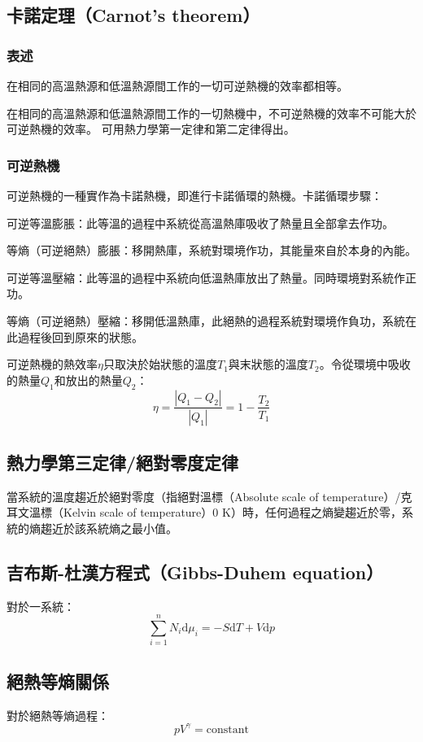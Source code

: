 \documentclass[a4paper,12pt]{report}
\begin{document}
\subsection{卡諾定理（Carnot's theorem）}
\subsubsection{表述}
\bit
\item 在相同的高溫熱源和低溫熱源間工作的一切可逆熱機的效率都相等。
\item 在相同的高溫熱源和低溫熱源間工作的一切熱機中，不可逆熱機的效率不可能大於可逆熱機的效率。
\eit
可用熱力學第一定律和第二定律得出。
\subsubsection{可逆熱機}
可逆熱機的一種實作為卡諾熱機，即進行卡諾循環的熱機。卡諾循環步驟：
\bit
\item 可逆等溫膨脹：此等溫的過程中系統從高溫熱庫吸收了熱量且全部拿去作功。
\item 等熵（可逆絕熱）膨脹：移開熱庫，系統對環境作功，其能量來自於本身的內能。
\item 可逆等溫壓縮：此等溫的過程中系統向低溫熱庫放出了熱量。同時環境對系統作正功。
\item 等熵（可逆絕熱）壓縮：移開低溫熱庫，此絕熱的過程系統對環境作負功，系統在此過程後回到原來的狀態。
\item 可逆熱機的熱效率$\eta$只取決於始狀態的溫度$T_1$與末狀態的溫度$T_2$。令從環境中吸收的熱量$Q_1$和放出的熱量$Q_2$：
\[\eta = \frac{\left|Q_1-Q_2\right|}{\left|Q_1\right|} = 1 - \frac{T_2}{T_1}\]
\eit
\subsection{熱力學第三定律/絕對零度定律}
當系統的溫度趨近於絕對零度（指絕對溫標（Absolute scale of temperature）/克耳文溫標（Kelvin scale of temperature）$0$ K）時，任何過程之熵變趨近於零，系統的熵趨近於該系統熵之最小值。
\subsection{吉布斯-杜漢方程式（Gibbs-Duhem equation）}
對於一系統：
\[\displaystyle \sum _{i=1}^{n}N_{i}\mathrm {d} \mu _{i}=-S\mathrm {d} T+V\mathrm {d} p\]
\subsection{絕熱等熵關係}
對於絕熱等熵過程：
\[pV^{\gamma}=\text{constant}\]
\end{document}
